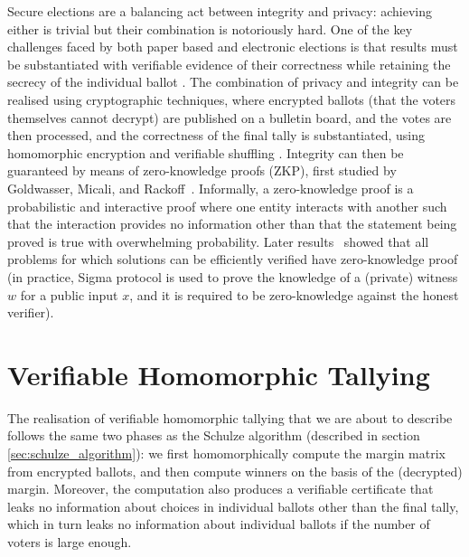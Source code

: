 Secure elections are a balancing act between integrity and privacy:
achieving either is trivial but their combination is notoriously hard.
One of the key challenges faced by both paper based and electronic
elections is that results must be substantiated with
verifiable evidence of their correctness while retaining the secrecy
of the individual ballot \citep{Bernhard:2017:PES}. 
The combination of privacy and integrity can be realised using cryptographic techniques, where
encrypted ballots (that the voters themselves cannot decrypt) are
published on a bulletin board, and the votes are then processed, and
the correctness of the final tally is substantiated, using
homomorphic encryption \citep{Hirt:2000:ERF} and verifiable shuffling
\citep{Bayer:2012:EZK}. 
Integrity can then be guaranteed by means of zero-knowledge proofs
(ZKP),
first studied by Goldwasser, Micali, and Rackoff~\citep{Goldwasser:1985:STOC}.
Informally, a zero-knowledge proof is a probabilistic and interactive proof where one
entity interacts with another such that the interaction provides
no information other than that the statement being proved is true with
overwhelming probability. 
Later results~\citep{Ben-Or:1988:CRYPTO,Goldreich:1991:ACM}
showed that 
all problems for which solutions can be efficiently verified have zero-knowledge
proof (in practice,  Sigma protocol \citep{10.1007/3-540-48658-5_19} is used 
to prove the knowledge of a (private) witness $w$ for a public input $x$, 
and it is required to be zero-knowledge against the honest verifier).

  
 \section{Verifiable Homomorphic Tallying}
\label{sec:verifiable_homomorphic}
The realisation of verifiable homomorphic tallying that we are about to
describe follows the same two phases as the Schulze algorithm (described in section \ref{sec:schulze_algorithm}): 
we first homomorphically compute the margin matrix from encrypted ballots, and then compute
winners on the basis of the (decrypted) margin. Moreover, the computation also
produces a verifiable certificate that leaks no information about
choices in individual ballots other than the final tally, which in
turn leaks no information about individual ballots if the number of
voters is large enough.  


